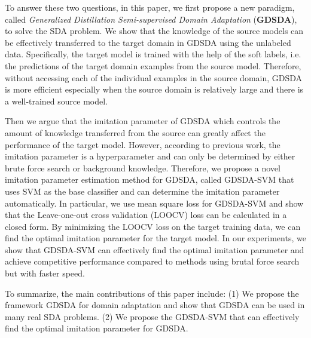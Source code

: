 To answer these two questions, in this paper, we first propose a new paradigm, called \textit{Generalized Distillation Semi-supervised Domain Adaptation} (\textbf{GDSDA}), to solve the SDA problem. 
We show that the knowledge of the source models can be effectively transferred to the target domain in GDSDA using the unlabeled data. Specifically, the target model is trained with the help of the soft labels, i.e. the predictions of the target domain examples from the source model. Therefore, without accessing each of the individual examples in the source domain, GDSDA is more efficient especially when the source domain is relatively large and there is a well-trained source model.

Then we argue that the imitation parameter of GDSDA which controls the amount of knowledge transferred from the source can greatly affect the performance of the target model.
However, according to previous work\cite{lopez2015unifying,Tzeng_2015_ICCV}, the imitation parameter is a hyperparameter and can only be determined by either brute force search or background knowledge. 
Therefore, we propose a novel imitation parameter estimation method for GDSDA, called GDSDA-SVM that uses SVM as the base classifier and can determine the imitation parameter automatically. In particular, we use mean square loss for GDSDA-SVM and show that the Leave-one-out cross validation (LOOCV) loss can be calculated in a closed form. By minimizing the LOOCV loss on the target training data, we can find the optimal imitation parameter for the target model. In our experiments, we show that GDSDA-SVM can effectively find the optimal imitation parameter and achieve competitive performance compared to methods using brutal force search but with faster speed. 

To summarize, the main contributions of this paper include: (1) We propose the framework GDSDA for domain adaptation and show that GDSDA can be used in many real SDA problems. (2) We propose the GDSDA-SVM that can effectively find the optimal imitation parameter for GDSDA.

